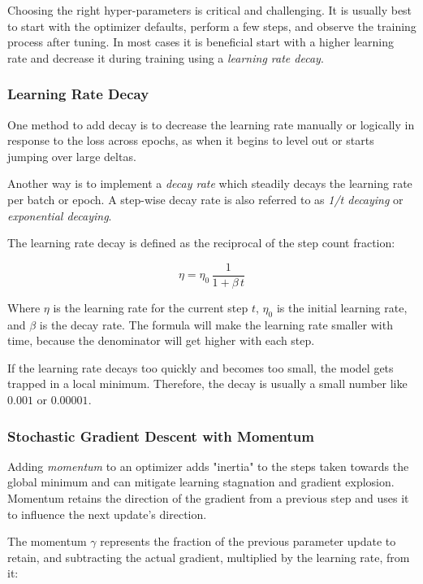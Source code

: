 \documentclass[a4paper]{report}
\begin{document}
Choosing the right hyper-parameters is critical and challenging. It is usually best to start with the optimizer defaults, perform a few steps, and observe the training process after tuning. In most cases it is beneficial start with a higher learning rate and decrease it during training using a \emph{learning rate decay}.

\subsubsection*{Learning Rate Decay}
One method to add decay is to decrease the learning rate manually or logically in response to the loss across epochs, as when it begins to level out or starts jumping over large deltas. 

Another way is to implement a \emph{decay rate} which steadily decays the learning rate per batch or epoch. A step-wise decay rate is also referred to as \emph{1/t decaying} or \emph{exponential decaying}. 

The learning rate decay is defined as the reciprocal of the step count fraction:

\begin{equation*}
    \eta = \eta_0 \, \frac{1}{1 + \beta \, t}
\end{equation*}

Where $\eta$ is the learning rate for the current step $t$, $\eta_0$ is the initial learning rate, and $\beta$ is the decay rate. The formula will make the learning rate smaller with time, because the denominator will get higher with each step.

If the learning rate decays too quickly and becomes too small, the model gets trapped in a local minimum. Therefore, the decay is usually a small number like $0.001$ or $0.00001$.

\subsubsection*{Stochastic Gradient Descent with Momentum}
Adding \emph{momentum} to an optimizer adds "inertia" to the steps taken towards the global minimum and can mitigate learning stagnation and gradient explosion. Momentum retains the direction of the gradient from a previous step and uses it to influence the next update's direction.

The momentum $\gamma$ represents the fraction of the previous parameter update to retain, and subtracting the actual gradient, multiplied by the learning rate, from it:
\end{document}
